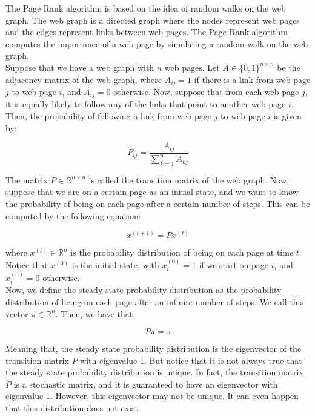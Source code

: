 The Page Rank algorithm is based on the idea of random walks on the web graph. The web graph is a directed graph
where the nodes represent web pages and the edges represent links between web pages. The Page Rank algorithm
computes the importance of a web page by simulating a random walk on the web graph.\\

Suppose that we have a web graph with $n$ web pages. Let $A \in \{0, 1\}^{n \times n}$ be the adjacency matrix of the
web graph, where $A_{ij} = 1$ if there is a link from web page $j$ to web page $i$, and $A_{ij} = 0$ otherwise. Now,
suppose that from each web page $j$, it is equally likely to follow any of the links that point to another web page $i$.
Then, the probability of following a link from web page $j$ to web page $i$ is given by:

\begin{equation}
    P_{ij} = \frac{A_{ij}}{\sum_{k=1}^n A_{kj}}
\end{equation}

The matrix $P \in \mathbb{R}^{n \times n}$ is called the transition matrix of the web graph. Now, suppose that
we are on a certain page as an initial state, and we want to know the probability of being on each page after
a certain number of steps. This can be computed by the following equation:

\begin{equation}
    x^{(t+1)} = P x^{(t)}
\end{equation}

where $x^{(t)} \in \mathbb{R}^n$ is the probability distribution of being on each page at time $t$. Notice that
$x^{(0)}$ is the initial state, with $x^{(0)}_i = 1$ if we start on page $i$, and $x^{(0)}_i = 0$ otherwise.\\

Now, we define the steady state probability distribution as the probability distribution of being on each page
after an infinite number of steps. We call this vector $\pi \in \mathbb{R}^n$. Then, we have that:

\begin{equation}
    P \pi = \pi
\end{equation}

Meaning that, the steady state probability distribution is the eigenvector of the transition matrix $P$ with
eigenvalue 1. But notice that it is not always true that the steady state probability distribution is unique.
In fact, the transition matrix $P$ is a stochastic matrix, and it is guaranteed to have an eigenvector with
eigenvalue 1. However, this eigenvector may not be unique. It can even happen that this distribution does 
not exist.\\

